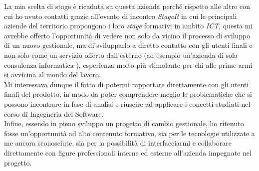 La mia scelta di stage è ricaduta su questa azienda perché rispetto alle altre con cui ho avuto contatti grazie all'evento di incontro \textit{StageIt} in cui le principali aziende del territorio propongono i loro \textit{stage} formativi in ambito \textit{ICT}, questa mi avrebbe offerto l'opportunità di vedere non solo da vicino il processo di sviluppo di un nuovo gestionale, ma di svilupparlo a diretto contatto con gli utenti finali e non solo come un servizio offerto dall'esterno (ad esempio un'azienda di sola consulenza informatica ), esperienza molto più stimolante per chi alle prime armi si avvicina al mondo del lavoro.
\\
Mi interessava dunque il fatto di potermi rapportare direttamente con gli utenti finali del prodotto, in modo da poter comprendere meglio le problematiche che si possono incontrare in fase di analisi e riuscire ad applicare i concetti studiati nel corso di Ingegneria del Software. 
\\ 
Infine, essendo in pieno sviluppo un progetto di cambio gestionale, ho ritenuto fosse un'opportunità ad alto contenuto formativo, sia per le tecnologie utilizzate a me ancora sconosciute, sia per la possibilità di interfacciarmi e collaborare direttamente con figure professionali interne ed esterne all'azienda impegnate nel progetto.
